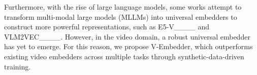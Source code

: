 Furthermore, with the rise of large language models, some works attempt to transform multi-modal large models (MLLMs) into universal embedders to construct more powerful representations, such as E5-V____ and VLM2VEC____. However, in the video domain, a robust universal embedder has yet to emerge.  For this reason, we propose V-Embedder, which outperforms existing video embedders across multiple tasks through synthetic-data-driven training.